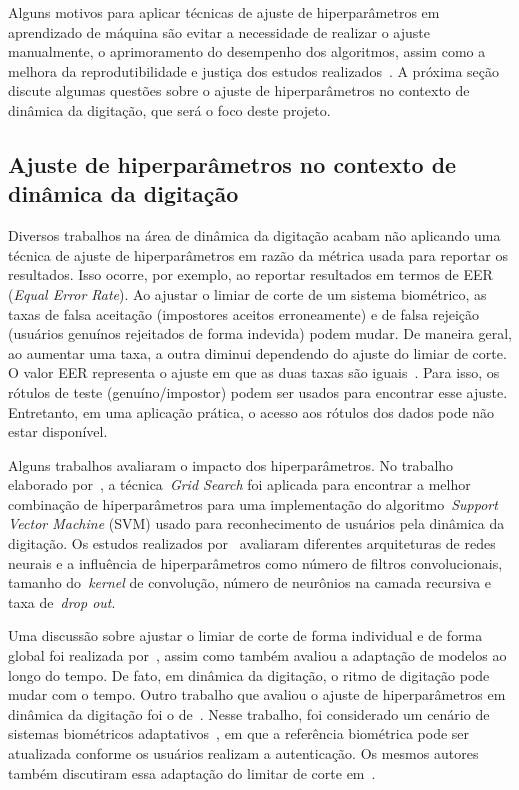 Alguns motivos para aplicar técnicas de ajuste de hiperparâmetros em aprendizado de máquina são evitar a necessidade de realizar o ajuste manualmente, o aprimoramento do desempenho dos algoritmos, assim como a melhora da reprodutibilidade e justiça dos estudos realizados~. A próxima seção discute algumas questões sobre o ajuste de hiperparâmetros no contexto de dinâmica da digitação, que será o foco deste projeto.


\subsection{Ajuste de hiperparâmetros no contexto de dinâmica da digitação}\label{trabalhos_relacionados}

Diversos trabalhos na área de dinâmica da digitação acabam não aplicando uma técnica de ajuste de hiperparâmetros em razão da métrica usada para reportar os resultados. Isso ocorre, por exemplo, ao reportar resultados em termos de EER (\textit{Equal Error Rate}). Ao ajustar o limiar de corte de um sistema biométrico, as taxas de falsa aceitação (impostores aceitos erroneamente) e de falsa rejeição (usuários genuínos rejeitados de forma indevida) podem mudar. De maneira geral, ao aumentar uma taxa, a outra diminui dependendo do ajuste do limiar de corte. O valor EER representa o ajuste em que as duas taxas são iguais~\cite{Roy2022systematic}. Para isso, os rótulos de teste (genuíno/impostor) podem ser usados para encontrar esse ajuste. Entretanto, em uma aplicação prática, o acesso aos rótulos dos dados pode não estar disponível.

Alguns trabalhos avaliaram o impacto dos hiperparâmetros. No trabalho elaborado por~, a técnica~\textit{Grid Search} foi aplicada para encontrar a melhor combinação de hiperparâmetros para uma implementação do algoritmo~\textit{Support Vector Machine} (SVM) usado para reconhecimento de usuários pela dinâmica da digitação. Os estudos realizados por~ avaliaram diferentes arquiteturas de redes neurais e a influência de hiperparâmetros como número de filtros convolucionais, tamanho do~\textit{kernel} de convolução, número de neurônios na camada recursiva e taxa de~\textit{drop out}.

Uma discussão sobre ajustar o limiar de corte de forma individual e de forma global foi realizada por~, assim como também avaliou a adaptação de modelos ao longo do tempo. De fato, em dinâmica da digitação, o ritmo de digitação pode mudar com o tempo. Outro trabalho que avaliou o ajuste de hiperparâmetros em dinâmica da digitação foi o de~. Nesse trabalho, foi considerado um cenário de sistemas biométricos adaptativos~\cite{Ryu2023Design}, em que a referência biométrica pode ser atualizada conforme os usuários realizam a autenticação. Os mesmos autores também discutiram essa adaptação do limitar de corte em~\cite{Mhenni2019DoubleSerial}.

